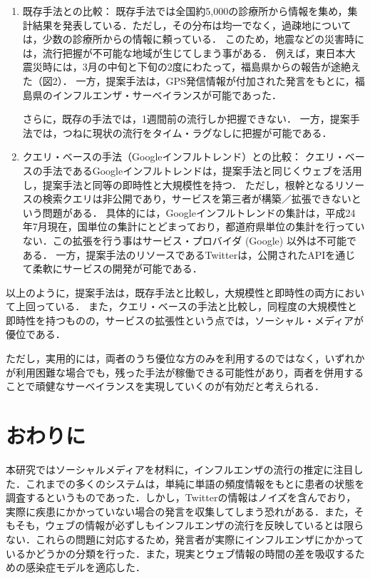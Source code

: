 \documentclass[japanese]{jnlp_1.4}
\begin{document}
\begin{enumerate}
\item{既存手法との比較：}
既存手法では全国約5,000の診療所から情報を集め，集計結果を発表している．ただし，その分布は均一でなく，過疎地については，少数の診療所からの情報に頼っている．
このため，地震などの災害時には，流行把握が不可能な地域が生じてしまう事がある．
例えば，東日本大震災時には，3月の中旬と下旬の2度にわたって，福島県からの報告が途絶えた（図2）．
一方，提案手法は，GPS発信情報が付加された発言をもとに，福島県のインフルエンザ・サーベイランスが可能であった．

さらに，既存の手法では，1週間前の流行しか把握できない．
一方，提案手法では，つねに現状の流行をタイム・ラグなしに把握が可能である．

\item{クエリ・ベースの手法（Googleインフルトレンド）との比較：}
クエリ・ベースの手法であるGoogleインフルトレンドは，提案手法と同じくウェブを活用し，提案手法と同等の即時性と大規模性を持つ．
ただし，根幹となるリソースの検索クエリは非公開であり，サービスを第三者が構築／拡張できないという問題がある．
具体的には，Googleインフルトレンドの集計は，平成24年7月現在，国単位の集計にとどまっており，都道府県単位の集計を行っていない．この拡張を行う事はサービス・プロバイダ (Google) 以外は不可能である．
一方，提案手法のリソースであるTwitterは，公開されたAPIを通じて柔軟にサービスの開発が可能である．
\end{enumerate}

以上のように，提案手法は，既存手法と比較し，大規模性と即時性の両方において上回っている．
また，クエリ・ベースの手法と比較し，同程度の大規模性と即時性を持つものの，サービスの拡張性という点では，ソーシャル・メディアが優位である．

ただし，実用的には，両者のうち優位な方のみを利用するのではなく，いずれかが利用困難な場合でも，残った手法が稼働できる可能性があり，両者を併用することで頑健なサーベイランスを実現していくのが有効だと考えられる．


\section{おわりに}

本研究ではソーシャルメディアを材料に，インフルエンザの流行の推定に注目した．これまでの多くのシステムは，単純に単語の頻度情報をもとに患者の状態を調査するというものであった．しかし，Twitterの情報はノイズを含んでおり，実際に疾患にかかっていない場合の発言を収集してしまう恐れがある．また，そもそも，ウェブの情報が必ずしもインフルエンザの流行を反映しているとは限らない．これらの問題に対応するため，発言者が実際にインフルエンザにかかっているかどうかの分類を行った．また，現実とウェブ情報の時間の差を吸収するための感染症モデルを適応した．
\end{document}
